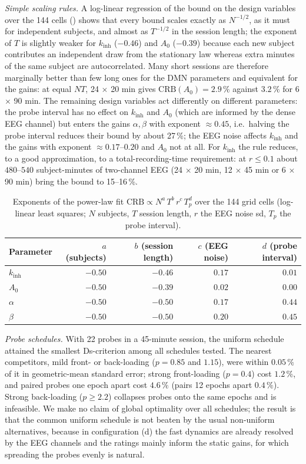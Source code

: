 \documentclass[12pt,a4paper]{article}
\theoremstyle{plain}
\theoremstyle{definition}
\theoremstyle{remark}
\newcommand{\kinh}{k_{\mathrm{inh}}}
\newcommand{\CRB}{\mathrm{CRB}}
\begin{document}
\emph{Simple scaling rules.} A log-linear regression of the bound on the design variables over the 144 cells () shows that every bound scales exactly as $N^{-1/2}$, as it must for independent subjects, and almost as $T^{-1/2}$ in the session length; the exponent of $T$ is slightly weaker for $\kinh$ ($-0.46$) and $A_0$ ($-0.39$) because each new subject contributes an independent draw from the stationary law whereas extra minutes of the same subject are autocorrelated. Many short sessions are therefore marginally better than few long ones for the DMN parameters and equivalent for the gains: at equal $NT$, 24 $\times$ 20 min gives $\CRB(A_0)=2.9\,\%$ against $3.2\,\%$ for 6 $\times$ 90 min. The remaining design variables act differently on different parameters: the probe interval has no effect on $\kinh$ and $A_0$ (which are informed by the dense EEG channel) but enters the gains $\alpha,\beta$ with exponent $\approx0.45$, i.e.\ halving the probe interval reduces their bound by about 27\,\%; the EEG noise affects $\kinh$ and the gains with exponent $\approx0.17$--$0.20$ and $A_0$ not at all. For $\kinh$ the rule reduces, to a good approximation, to a total-recording-time requirement: at $r\le0.1$ about $480$--$540$ subject-minutes of two-channel EEG (24 $\times$ 20 min, 12 $\times$ 45 min or 6 $\times$ 90 min) bring the bound to 15--16\,\%.

\begin{table}[t]
\centering\small
\caption{Exponents of the power-law fit $\CRB\propto N^{a}\,T^{b}\,r^{c}\,T_p^{d}$ over the 144 grid cells (log-linear least squares; $N$ subjects, $T$ session length, $r$ the EEG noise sd, $T_p$ the probe interval).}
\label{tab:scaling}
\begin{tabular}{lrrrr}
\toprule
Parameter & $a$ (subjects) & $b$ (session length) & $c$ (EEG noise) & $d$ (probe interval) \\
\midrule
$\kinh$  & $-0.50$ & $-0.46$ & $0.17$ & $0.01$ \\
$A_0$    & $-0.50$ & $-0.39$ & $0.02$ & $0.00$ \\
$\alpha$ & $-0.50$ & $-0.50$ & $0.17$ & $0.44$ \\
$\beta$  & $-0.50$ & $-0.50$ & $0.20$ & $0.45$ \\
\bottomrule
\end{tabular}
\end{table}

\emph{Probe schedules.} With 22 probes in a 45-minute session, the uniform schedule attained the smallest Ds-criterion among all schedules tested. The nearest competitors, mild front- or back-loading ($p=0.85$ and $1.15$), were within $0.05\,\%$ of it in geometric-mean standard error; strong front-loading ($p=0.4$) cost $1.2\,\%$, and paired probes one epoch apart cost $4.6\,\%$ (pairs 12 epochs apart $0.4\,\%$). Strong back-loading ($p\ge2.2$) collapses probes onto the same epochs and is infeasible. We make no claim of global optimality over all schedules; the result is that the common uniform schedule is not beaten by the usual non-uniform alternatives, because in configuration (d) the fast dynamics are already resolved by the EEG channels and the ratings mainly inform the static gains, for which spreading the probes evenly is natural.
\end{document}
